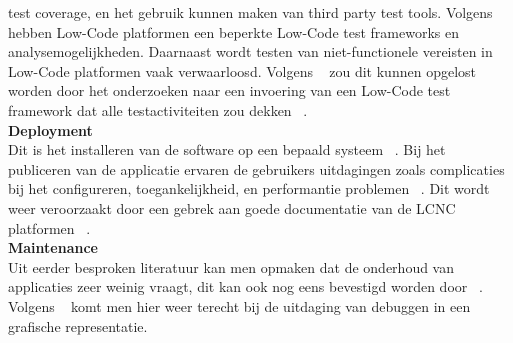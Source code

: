 test coverage, en het gebruik kunnen maken van third party test tools. 
Volgens ~\textcite{Rokis_2022} hebben Low-Code platformen een beperkte Low-Code test frameworks en analysemogelijkheden. 
Daarnaast wordt testen van niet-functionele vereisten in Low-Code platformen vaak verwaarloosd. 
Volgens ~\textcite{Rokis_2022} zou dit kunnen opgelost worden door het onderzoeken naar een invoering van een Low-Code test framework dat alle testactiviteiten zou dekken ~\autocite{Rokis_2022}.
\\
\textbf{Deployment}
\\
Dit is het installeren van de software op een bepaald systeem ~\autocite{Ghumatkar_2023}.
Bij het publiceren van de applicatie ervaren de gebruikers uitdagingen zoals complicaties bij het configureren, toegankelijkheid, en performantie problemen ~\autocite{Rokis_2022}. 
Dit wordt weer veroorzaakt door een gebrek aan goede documentatie van de LCNC platformen ~\autocite{Rokis_2022}.
\\
\textbf{Maintenance}
\\
Uit eerder besproken literatuur kan men opmaken dat de onderhoud van applicaties zeer weinig vraagt, dit kan ook nog eens bevestigd worden door ~\textcite{Rokis_2022}.
Volgens ~\textcite{Rokis_2022} komt men hier weer terecht bij de uitdaging van debuggen in een grafische representatie.


